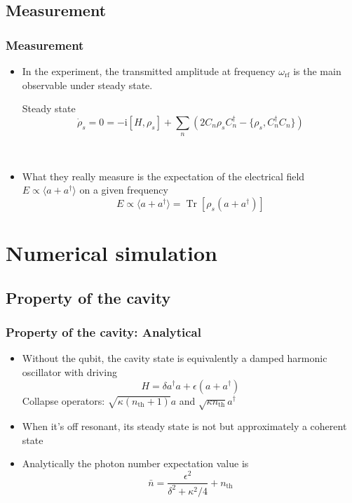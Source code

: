 \documentclass[xcolor=dvipsnames,hyperref={CJKbookmarks=true}]{beamer}
\newcommand\mi{\mathrm{i}}
\newcommand{\rf}{\text{rf}}
\newcommand{\thm}{\text{th}}
\DeclareMathOperator{\Tr}{Tr}
\begin{document}
\subsection{Measurement}
\begin{frame}[t]\frametitle{Measurement}
	\begin{itemize}
		\item In the experiment, the transmitted amplitude at frequency $\omega_{\rf}$ is the main observable under steady state. 
	\begin{block}{Steady state}
	$$
	\dot\rho_s = 0 = -\mi[H, \rho_{s}] + \sum_n \left(2C_n \rho_s C_n^\dag - 
	\{\rho_s, C_n^\dag C_n\}\right)
	$$
	\end{block}
	~

		\item What they really measure is the expectation of the 
		electrical field $E\propto\langle a + a^\dag \rangle$ \cite{schuster2007circuit} on a given frequency
	$$
	E\propto \langle a + a^\dag \rangle = \Tr [\rho_{s}(a+a^\dag)]
	$$
	\end{itemize}
\end{frame}

\section{Numerical simulation}
\subsection{Property of the cavity}
\begin{frame}[t]\frametitle{Property of the cavity: Analytical}
\begin{itemize}
	\item Without the qubit, the cavity state is equivalently a damped harmonic oscillator with driving
	$$
	 H = \delta a^\dag a + \epsilon (a + a^\dag)
	$$
	Collapse operators: $\sqrt{\kappa(n_{\thm}+1)}a$ and 
	$\sqrt{\kappa n_{\thm}}a^\dag$
	\item When it's off resonant, its steady state is not but approximately a coherent state
	\item Analytically the photon number expectation value is 
	$$
	\bar n = \frac{\epsilon^2}{\delta^2 + \kappa^2/4} + n_{\thm}
	$$
\end{itemize}
\end{frame}
\end{document}
